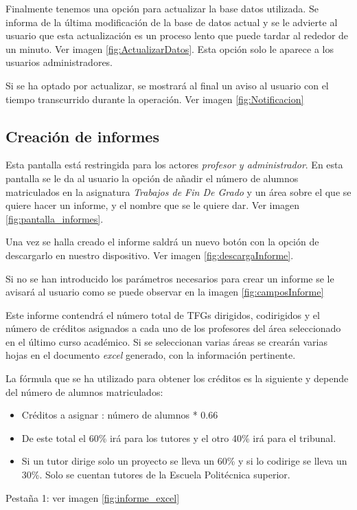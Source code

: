 Finalmente tenemos una opción para actualizar la base datos utilizada. Se informa de la última modificación de la base de datos actual y se le advierte al usuario que esta actualización es un proceso lento que puede tardar al rededor de un minuto. Ver imagen \ref{fig:ActualizarDatos}. Esta opción solo le aparece a los usuarios administradores.


Si se ha optado por actualizar, se mostrará al final un aviso al usuario con el tiempo transcurrido durante la operación. Ver imagen \ref{fig:Notificacion}

\subsection{Creación de informes}
Esta pantalla está restringida para los actores \emph{profesor y administrador}.
En esta pantalla se le da al usuario la opción de añadir el número de alumnos matriculados en la asignatura \emph{Trabajos de Fin De Grado} y un área sobre el que se quiere hacer un informe, y el nombre que se le quiere dar. 
Ver imagen \ref{fig:pantalla_informes}.


Una vez se halla creado el informe saldrá un nuevo botón con la opción de descargarlo en nuestro dispositivo. Ver imagen \ref{fig:descargaInforme}.


Si no se han introducido los parámetros necesarios para crear un informe se le avisará al usuario como se puede observar en la imagen \ref{fig:camposInforme}


Este informe contendrá el número total de TFGs dirigidos, codirigidos y el número de créditos asignados a cada uno de los profesores del área seleccionado en el último curso académico. Si se seleccionan varias áreas se crearán varias hojas en el documento \emph{excel} generado, con la información pertinente. 

La fórmula que se ha utilizado para obtener los créditos es la siguiente y depende del número de alumnos matriculados:
\begin{itemize}
	\item Créditos a asignar : número de alumnos * 0.66
	\item De este total el 60\% irá para los tutores y el otro 40\% irá para el tribunal.
	\item Si un tutor dirige solo un proyecto se lleva un 60\% y si lo codirige se lleva un 30\%. Solo se cuentan tutores de la Escuela Politécnica superior.
\end{itemize}
Pestaña 1: ver imagen \ref{fig:informe_excel}

